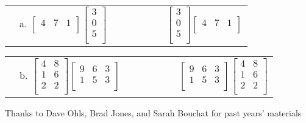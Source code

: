 \documentclass[11pt]{article}
\begin{document}
\begin{enumerate}
\begin{tabular}{cccc}
&
a. $\left[\begin{array}{ccc}
4 & 7 & 1 \\
\end{array}\right]
\left[\begin{array}{c}
3 \\
0 \\
5 \\
\end{array}\right]$
&
~~~~~~~~
&
$\left[\begin{array}{c}
3 \\
0 \\
5 \\
\end{array}\right]
\left[\begin{array}{ccc}
4 & 7 & 1 \\
\end{array}\right]$
\end{tabular}


\begin{tabular}{cccc}
&
b. $\left[\begin{array}{cc}
4 & 8 \\
1 & 6 \\
2 & 2 \\
\end{array}\right]
\left[\begin{array}{ccc}
9 & 6 & 3 \\
1 & 5 & 3 \\
\end{array}\right]$
&
~~~~~~~~
&
$\left[\begin{array}{ccc}
9 & 6 & 3 \\
1 & 5 & 3 \\
\end{array}\right]
\left[\begin{array}{cc}
4 & 8 \\
1 & 6 \\
2 & 2 \\
\end{array}\right]$
\end{tabular}




\end{enumerate}



\vfill
\begin{center}
\small{Thanks to Dave Ohls, Brad Jones, and Sarah Bouchat for past years' materials}
\end{center}
\end{document}
